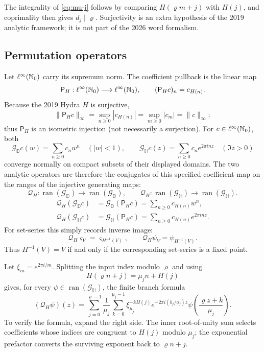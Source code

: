 The integrality of \cref{eq:mu-j} follows by comparing
$H(\varrho m+j)$ with $H(j)$, and coprimality then gives
$d_j\mid\varrho$.  Surjectivity is an extra hypothesis of the 2019 analytic
framework; it is not part of the 2026 word formalism.

\subsection{Permutation operators}

Let $\ell^\infty(\mathbb N_0)$ carry its supremum norm.  The coefficient pullback
is the linear map
\[
 \mathsf P_H:\ell^\infty(\mathbb N_0)\longrightarrow\ell^\infty(\mathbb N_0),
 \qquad (\mathsf P_Hc)_n=c_{H(n)}.
\]
Because the 2019 Hydra $H$ is surjective,
\[
 \|\mathsf P_Hc\|_\infty
 =\sup_{n\geq0}|c_{H(n)}|
 =\sup_{m\geq0}|c_m|=\|c\|_\infty;
\]
thus $\mathsf P_H$ is an isometric injection (not necessarily a surjection).
For $c\in\ell^\infty(\mathbb N_0)$, both
\[
 \mathcal G_{\mathbb D}c(w)=\sum_{n\geq0}c_nw^n
 \quad(|w|<1),
 \qquad
 \mathcal G_{\mathbb H}c(z)=\sum_{n\geq0}c_ne^{2\pi inz}
 \quad(\Im z>0)
\]
converge normally on compact subsets of their displayed domains.  The two
analytic operators are therefore the conjugates of this specified
coefficient map on the ranges of the injective generating maps:
\[
 \mathcal Q_H:\operatorname{ran}(\mathcal G_{\mathbb D})
 \longrightarrow\operatorname{ran}(\mathcal G_{\mathbb D}),
 \qquad
 \mathscr Q_H:\operatorname{ran}(\mathcal G_{\mathbb H})
 \longrightarrow\operatorname{ran}(\mathcal G_{\mathbb H}).
\]
\begin{align}
 \mathcal Q_H(\mathcal G_{\mathbb D}c)
   &=\mathcal G_{\mathbb D}(\mathsf P_Hc)
     =\sum_{n\geq0}c_{H(n)}w^n,\label{eq:ordinary-permutation}\\
 \mathscr Q_H(\mathcal G_{\mathbb H}c)
   &=\mathcal G_{\mathbb H}(\mathsf P_Hc)
     =\sum_{n\geq0}c_{H(n)}e^{2\pi inz}.
     \label{eq:Fourier-permutation}
\end{align}
For set-series this simply records inverse image:
\begin{equation}
\label{eq:Q-inverse-image}
 \mathcal Q_H\varsigma_V=\varsigma_{H^{-1}(V)},
 \qquad
 \mathscr Q_H\psi_V=\psi_{H^{-1}(V)}.
\end{equation}
Thus $H^{-1}(V)=V$ if and only if the corresponding set-series is a fixed
point.

Let $\xi_m=e^{2\pi i/m}$.  Splitting the input index modulo $\varrho$ and
using
\[
 H(\varrho n+j)=\mu_jn+H(j)
\]
gives, for every
$\psi\in\operatorname{ran}(\mathcal G_{\mathbb H})$, the finite branch
formula
\begin{equation}
\label{eq:Fourier-permutation-branch}
 (\mathscr Q_H\psi)(z)
 =\sum_{j=0}^{\varrho-1}\frac1{\mu_j}
   \sum_{k=0}^{\mu_j-1}\xi_{\mu_j}^{-kH(j)}
   e^{-2\pi i(b_j/a_j)z}
   \psi\left(\frac{\varrho z+k}{\mu_j}\right).
\end{equation}
To verify the formula, expand the right side.  The inner root-of-unity sum
selects coefficients whose indices are congruent to $H(j)$ modulo $\mu_j$;
the exponential prefactor converts the surviving exponent back to
$\varrho n+j$.


